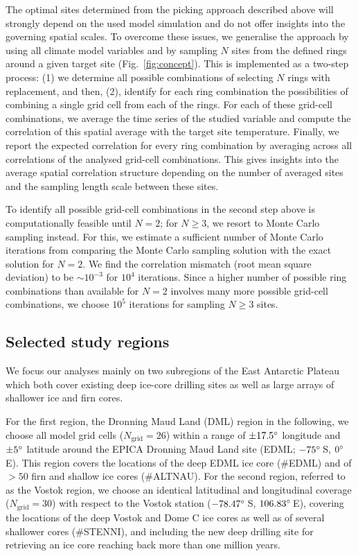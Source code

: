\documentclass[cp, manuscript]{copernicus}
\begin{document}
The optimal sites determined from the picking approach described above will
strongly depend on the used model simulation and do not offer insights into the
governing spatial scales. To overcome these issues, we generalise the approach
by using all climate model variables and by sampling $N$ sites from the defined
rings around a given target site (Fig.~\ref{fig:concept}). This is implemented
as a two-step process: (1) we determine all possible combinations of selecting
$N$ rings with replacement, and then, (2), identify for each ring combination
the possibilities of combining a single grid cell from each of the rings. For
each of these grid-cell combinations, we average the time series of the studied
variable and compute the correlation of this spatial average with the target
site temperature. Finally, we report the expected correlation for every ring
combination by averaging across all correlations of the analysed grid-cell
combinations. This gives insights into the average spatial correlation structure
depending on the number of averaged sites and the sampling length scale between
these sites.

To identify all possible grid-cell combinations in the second step above is
computationally feasible until $N=2$; for $N\geq3$, we resort to Monte Carlo
sampling instead. For this, we estimate a sufficient number of Monte Carlo
iterations from comparing the Monte Carlo sampling solution with the exact
solution for $N=2$. We find the correlation mismatch (root mean square
deviation) to be $\sim10^{-3}$ for $10^4$ iterations. Since a higher number of
possible ring combinations than available for $N=2$ involves many more possible
grid-cell combinations, we choose $10^5$ iterations for sampling $N\geq3$ sites.

\subsection{Selected study regions}\label{methods:regions}

We focus our analyses mainly on two subregions of the East Antarctic Plateau
which both cover existing deep ice-core drilling sites as well as large arrays
of shallower ice and firn cores.

For the first region, the Dronning Maud Land (DML) region in the following, we
choose all model grid cells ($N_{\mathrm{grid}}=26$) within a range of
$\pm17.5^{\circ}$ longitude and $\pm5^{\circ}$ latitude around the EPICA Dronning
Maud Land site (EDML; $-75^{\circ}$\,S, $0^{\circ}$\,E). This region covers the
locations of the deep EDML ice core (\#EDML) and of $>50$ firn and shallow ice
cores (\#ALTNAU). For the second region, referred to as the Vostok region, we
choose an identical latitudinal and longitudinal coverage
($N_{\mathrm{grid}}=30$) with respect to the Vostok station ($-78.47^{\circ}$\,S,
$106.83^{\circ}$\,E), covering the locations of the deep Vostok and Dome C ice
cores as well as of several shallower cores (\#STENNI), and including the new
deep drilling site for retrieving an ice core reaching back more than one
million years.
\end{document}
